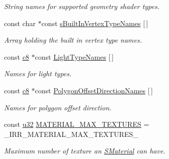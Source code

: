 \begin{DoxyCompactItemize}
\begin{DoxyCompactList}\small\item\em String names for supported geometry shader types. \end{DoxyCompactList}\item 
\mbox{\label{namespaceirr_1_1video_a0f4d6a80a8777457dc9fbe966588f6a6}} 
const char $\ast$const \hyperlink{namespaceirr_1_1video_a0f4d6a80a8777457dc9fbe966588f6a6}{s\+Built\+In\+Vertex\+Type\+Names} \mbox{[}$\,$\mbox{]}
\begin{DoxyCompactList}\small\item\em Array holding the built in vertex type names. \end{DoxyCompactList}\item 
\mbox{\label{namespaceirr_1_1video_a345c3fd9c805bbe508a49fa367846bc8}} 
const \hyperlink{namespaceirr_a9395eaea339bcb546b319e9c96bf7410}{c8} $\ast$const \hyperlink{namespaceirr_1_1video_a345c3fd9c805bbe508a49fa367846bc8}{Light\+Type\+Names} \mbox{[}$\,$\mbox{]}
\begin{DoxyCompactList}\small\item\em Names for light types. \end{DoxyCompactList}\item 
\mbox{\label{namespaceirr_1_1video_a4c81c2f4785908499fe7eb8214df879a}} 
const \hyperlink{namespaceirr_a9395eaea339bcb546b319e9c96bf7410}{c8} $\ast$const \hyperlink{namespaceirr_1_1video_a4c81c2f4785908499fe7eb8214df879a}{Polygon\+Offset\+Direction\+Names} \mbox{[}$\,$\mbox{]}
\begin{DoxyCompactList}\small\item\em Names for polygon offset direction. \end{DoxyCompactList}\item 
\mbox{\label{namespaceirr_1_1video_ad41ca808200ca2e8e9d9326355020052}} 
const \hyperlink{namespaceirr_a0416a53257075833e7002efd0a18e804}{u32} \hyperlink{namespaceirr_1_1video_ad41ca808200ca2e8e9d9326355020052}{M\+A\+T\+E\+R\+I\+A\+L\+\_\+\+M\+A\+X\+\_\+\+T\+E\+X\+T\+U\+R\+ES} = \+\_\+\+I\+R\+R\+\_\+\+M\+A\+T\+E\+R\+I\+A\+L\+\_\+\+M\+A\+X\+\_\+\+T\+E\+X\+T\+U\+R\+E\+S\+\_\+
\begin{DoxyCompactList}\small\item\em Maximum number of texture an \hyperlink{classirr_1_1video_1_1SMaterial}{S\+Material} can have. \end{DoxyCompactList}\item 

\end{DoxyCompactItemize}
